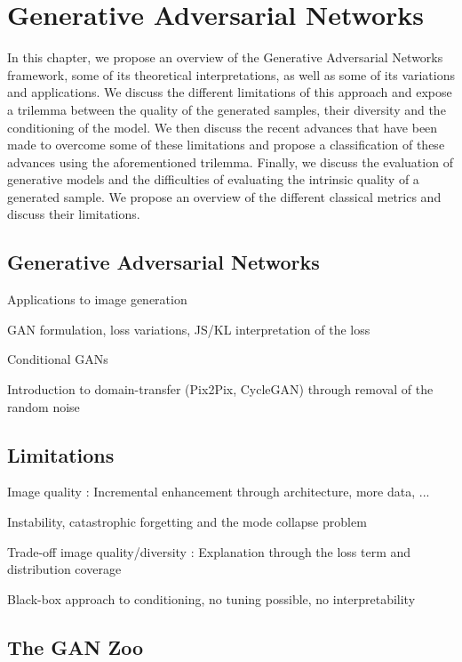 \chapter{Generative Adversarial Networks}
\label{chap:chapter1}

\begin{chapterabstract}
	In this chapter, we propose an overview	 of the Generative Adversarial Networks \cite{Goodfellow2014} framework, some of its theoretical interpretations, as well as some of its variations and applications. We discuss the different limitations of this approach and expose a trilemma between the quality of the generated samples, their diversity and the conditioning of the model. We then discuss the recent advances that have been made to overcome some of these limitations and propose a classification of these advances using the aforementioned trilemma. Finally, we discuss the evaluation of generative models and the difficulties of evaluating the intrinsic quality of a generated sample.  We propose an overview of the different classical metrics and discuss their limitations.
\end{chapterabstract}

\section{Generative Adversarial Networks}
Applications to image generation

GAN formulation, loss variations, JS/KL interpretation of the loss

Conditional GANs

Introduction to domain-transfer (Pix2Pix, CycleGAN) through removal of the random noise

\section{Limitations}
Image quality : Incremental enhancement through architecture, more data, ... 

Instability, catastrophic forgetting and the mode collapse problem

Trade-off image quality/diversity : Explanation through the loss term and distribution coverage

Black-box approach to conditioning, no tuning possible, no interpretability

\section{The GAN Zoo}

